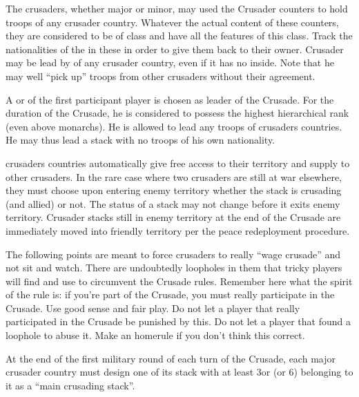 \phadm

 The crusaders, whether major or minor, may used the
Crusader \ARMY counters to hold troops of any crusader country.
\bparag Whatever the actual content of these counters, they are considered to
be of class \CAIII and have all the features of this class.
\bparag Track the nationalities of the \LD in these \ARMY in order to give
them back to their owner.
\bparag Crusader \ARMY may be lead by \LeaderG of any crusader country, even
if it has no \LD inside.
\bparag Note that he may well ``pick up'' troops from other crusaders without
their agreement.

 A \LeaderG or \LeaderA of the first
participant player is chosen as leader of the Crusade. For the duration of the
Crusade, he is considered to possess the highest hierarchical rank (even above
monarchs).
\bparag He is allowed to lead any troops of crusaders countries. He may thus
lead a stack with no troops of his own nationality.

\phmil
{} crusaders countries automatically give free access
to their territory and supply to other crusaders.
\bparag In the rare case where two crusaders are still at war elsewhere, they
must choose upon entering enemy territory whether the stack is crusading (and
allied) or not. The status of a stack may not change before it exits enemy
territory. Crusader stacks still in enemy territory at the end of the Crusade
are immediately moved into friendly territory per the peace redeployment
procedure.

\begin{designnote}
  The following points are meant to force crusaders to really ``wage crusade''
  and not sit and watch. There are undoubtedly loopholes in them that tricky
  players will find and use to circumvent the Crusade rules. Remember here
  what the spirit of the rule is: if you're part of the Crusade, you must
  really participate in the Crusade. Use good sense and fair play. Do not let
  a player that really participated in the Crusade be punished by this. Do not
  let a player that found a loophole to abuse it. Make an homerule if you
  don't think this correct.
\end{designnote}
 At the end of the first military round
of each turn of the Crusade, each major crusader country must design one of
its stack with at least 3\LD or \ND (or 6\NGD) belonging to it as a ``main
crusading stack''.

